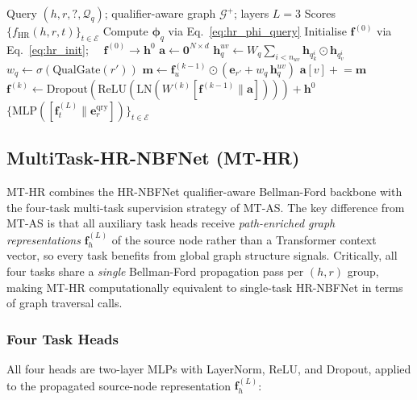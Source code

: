 \documentclass[10pt,journal,compsoc]{IEEEtran}
\begin{document}
\begin{algorithm}[t]
\caption{HR-NBFNet Forward Pass}
\label{alg:hrnbfnet}
\begin{algorithmic}[1]
\Require Query $(h, r, ?, \mathcal{Q}_q)$;
  qualifier-aware graph $\mathcal{G}^+$; layers $L{=}3$
\Ensure Scores $\{f_{\mathrm{HR}}(h,r,t)\}_{t \in \mathcal{E}}$
\State Compute $\boldsymbol{\phi}_q$ via Eq.~\eqref{eq:hr_phi_query}
\State Initialise $\mathbf{f}^{(0)}$ via Eq.~\eqref{eq:hr_init};
  $\quad \mathbf{f}^{(0)} \to \mathbf{h}^0$
  \State $\mathbf{a} \leftarrow \mathbf{0}^{N \times d}$
    \State $\mathbf{h}_q^{uv} \leftarrow
      W_q\!\sum_{i < n_{uv}}
      \mathbf{h}_{q_k^i} \odot \mathbf{h}_{q_v^i}$
    \State $w_q \leftarrow
      \sigma(\mathrm{QualGate}(r'))$
    \State $\mathbf{m} \leftarrow
      \mathbf{f}_u^{(k-1)} \odot
      (\mathbf{e}_{r'} + w_q\,\mathbf{h}_q^{uv})$
    \State $\mathbf{a}[v] \mathrel{+}= \mathbf{m}$
  \EndFor
  \State $\mathbf{f}^{(k)} \leftarrow
    \mathrm{Dropout}(\mathrm{ReLU}(\mathrm{LN}(
    W^{(k)}[\mathbf{f}^{(k-1)} \| \mathbf{a}])))
    + \mathbf{h}^0$
\EndFor
\State \Return
  $\bigl\{\mathrm{MLP}([\mathbf{f}_t^{(L)} \|
  \mathbf{e}_r^{\mathrm{qry}}])\bigr\}_{t \in \mathcal{E}}$
\end{algorithmic}
\end{algorithm}

\subsection{MultiTask-HR-NBFNet (MT-HR)}
\label{ssec:mthrnbfnet}

MT-HR combines the HR-NBFNet qualifier-aware Bellman-Ford
backbone with the four-task multi-task supervision strategy
of MT-AS.
The key difference from MT-AS is that all auxiliary task
heads receive \emph{path-enriched graph representations}
$\mathbf{f}_h^{(L)}$ of the source node rather than a
Transformer context vector, so every task benefits from
global graph structure signals.
Critically, all four tasks share a \emph{single} Bellman-Ford
propagation pass per $(h,r)$ group, making MT-HR
computationally equivalent to single-task HR-NBFNet in
terms of graph traversal calls.

\subsubsection{Four Task Heads}
All four heads are two-layer MLPs with LayerNorm, ReLU, and
Dropout, applied to the propagated source-node representation
$\mathbf{f}_h^{(L)}$:
\end{document}
